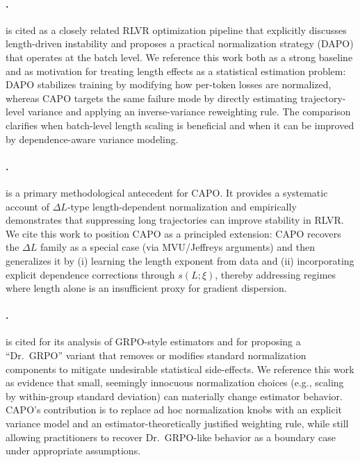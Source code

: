 \paragraph{\citet{yu2025dapo}.}
\citet{yu2025dapo} is cited as a closely related RLVR optimization pipeline that explicitly discusses length-driven instability and proposes a practical normalization strategy (DAPO) that operates at the batch level.
We reference this work both as a strong baseline and as motivation for treating length effects as a statistical estimation problem: DAPO stabilizes training by modifying how per-token losses are normalized, whereas CAPO targets the same failure mode by directly estimating trajectory-level variance and applying an inverse-variance reweighting rule.
The comparison clarifies when batch-level length scaling is beneficial and when it can be improved by dependence-aware variance modeling.

\paragraph{\citet{he2025deltal}.}
\citet{he2025deltal} is a primary methodological antecedent for CAPO.
It provides a systematic account of $\Delta L$-type length-dependent normalization and empirically demonstrates that suppressing long trajectories can improve stability in RLVR.
We cite this work to position CAPO as a principled extension: CAPO recovers the $\Delta L$ family as a special case (via MVU/Jeffreys arguments) and then generalizes it by (i) learning the length exponent from data and (ii) incorporating explicit dependence corrections through $s(L;\xi)$, thereby addressing regimes where length alone is an insufficient proxy for gradient dispersion.

\paragraph{\citet{liu2025drgrpo}.}
\citet{liu2025drgrpo} is cited for its analysis of GRPO-style estimators and for proposing a ``Dr.\ GRPO'' variant that removes or modifies standard normalization components to mitigate undesirable statistical side-effects.
We reference this work as evidence that small, seemingly innocuous normalization choices (e.g., scaling by within-group standard deviation) can materially change estimator behavior.
CAPO's contribution is to replace ad hoc normalization knobs with an explicit variance model and an estimator-theoretically justified weighting rule, while still allowing practitioners to recover Dr.\ GRPO-like behavior as a boundary case under appropriate assumptions.

